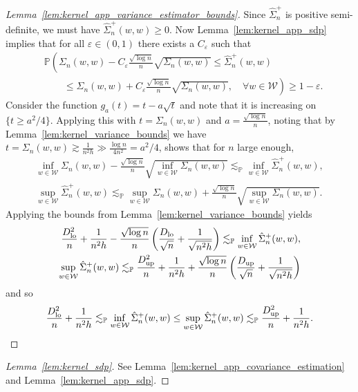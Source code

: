 \documentclass[11pt,lof]{puthesis}
\renewcommand{\P}{\ensuremath{\mathbb{P}}}
\newcommand{\cW}{\ensuremath{\mathcal{W}}}
\newcommand{\Dl}{\ensuremath{D_{\textup{lo}}}}
\newcommand{\Du}{\ensuremath{D_{\textup{up}}}}
\theoremstyle{break}
\theoremstyle{proof}
\newtheorem{proof}{Proof}
\begin{document}
\begin{proof}[Lemma~\ref{lem:kernel_app_variance_estimator_bounds}]

Since $\hat \Sigma_n^+$ is positive semi-definite,
we must have $\hat \Sigma_n^+(w,w) \geq 0$.
Now Lemma~\ref{lem:kernel_app_sdp}
implies that for all $\varepsilon \in (0,1)$
there exists a $C_\varepsilon$ such that
%
\begin{align*}
&\P\left(
\Sigma_n(w,w) - C_\varepsilon \frac{\sqrt{\log n}}{n} \sqrt{\Sigma_n(w,w)}
\leq
\hat \Sigma_n^+(w,w)
\right.
\\
&\left.
\qquad\leq
\Sigma_n(w,w) + C_\varepsilon \frac{\sqrt{\log n}}{n}
\sqrt{\Sigma_n(w,w)},
\quad \forall w \in \cW
\right)
\geq 1-\varepsilon.
\end{align*}
%
Consider the function
$g_a(t) = t - a \sqrt{t}$
and note that it is increasing on $\{t \geq a^2/4\}$.
Applying this with $t = \Sigma_n(w,w)$
and $a = \frac{\sqrt{\log n}}{n}$,
noting that by Lemma~\ref{lem:kernel_variance_bounds} we have
$t = \Sigma_n(w,w) \gtrsim \frac{1}{n^2h}
\gg \frac{\log n}{4n^2} = a^2/4$,
shows that for $n$ large enough,
%
\begin{align*}
\inf_{w \in \cW} \Sigma_n(w,w)
- \frac{\sqrt{\log n}}{n} \sqrt{\inf_{w \in \cW} \Sigma_n(w,w)}
\lesssim_\P
\inf_{w \in \cW}\hat \Sigma_n^+(w,w), \\
\sup_{w \in \cW}\hat \Sigma_n^+(w,w)
\lesssim_\P
\sup_{w \in \cW} \Sigma_n(w,w)
+ \frac{\sqrt{\log n}}{n} \sqrt{\sup_{w \in \cW} \Sigma_n(w,w)}.
\end{align*}
%
Applying the bounds from Lemma~\ref{lem:kernel_variance_bounds}
yields
%
\begin{align*}
\frac{\Dl^2}{n} + \frac{1}{n^2h}
- \frac{\sqrt{\log n}}{n}
\left( \frac{\Dl}{\sqrt n} + \frac{1}{\sqrt{n^2h}} \right)
\lesssim_\P
\inf_{w \in \cW}\hat \Sigma_n^+(w,w), \\
\sup_{w \in \cW}\hat \Sigma_n^+(w,w)
\lesssim_\P
\frac{\Du^2}{n} + \frac{1}{n^2h}
+ \frac{\sqrt{\log n}}{n}
\left( \frac{\Du}{\sqrt n} + \frac{1}{\sqrt{n^2h}} \right)
\end{align*}
%
and so
%
\begin{align*}
\frac{\Dl^2}{n} + \frac{1}{n^2h}
\lesssim_\P
\inf_{w \in \cW}\hat \Sigma_n^+(w,w)
\leq
\sup_{w \in \cW}\hat \Sigma_n^+(w,w)
\lesssim_\P
\frac{\Du^2}{n} + \frac{1}{n^2h}.
\end{align*}
\end{proof}

\begin{proof}[Lemma~\ref{lem:kernel_sdp}]
See Lemma~\ref{lem:kernel_app_covariance_estimation}
and Lemma~\ref{lem:kernel_app_sdp}.
\end{proof}
\end{document}
